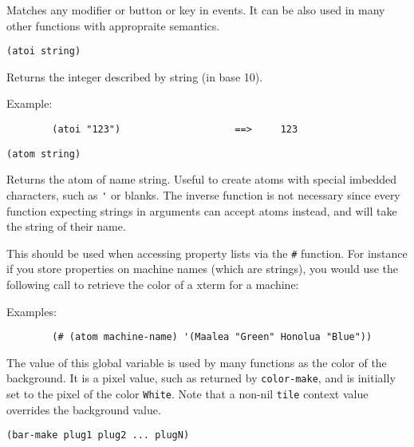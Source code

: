 
Matches any modifier or button or key in events. It can be also used in many
other functions with appropraite semantics.

        
{\usagefont\begin{verbatim}
(atoi string)
\end{verbatim}}\usageupspace

Returns the integer described by string (in base 10).

{Example:\exemplefont\upspace\begin{verbatim}
        (atoi "123")                    ==>     123
\end{verbatim}}

        
{\usagefont\begin{verbatim}
(atom string)
\end{verbatim}}\usageupspace

Returns the atom of name string. Useful to create atoms with special
imbedded characters, such as \verb"'" or blanks. The inverse function is not
necessary since every {\WOOL} function expecting strings in arguments can
accept atoms instead, and will take the string of their name.  

This should be used when accessing property lists via the \verb|#| function.
For instance if you store properties on machine names (which are strings),
you would use the following call to retrieve the color of a xterm for a
machine:

{Examples:\exemplefont\upspace\begin{verbatim}
        (# (atom machine-name) '(Maalea "Green" Honolua "Blue"))
\end{verbatim}}

        

The value of this global variable is used by many functions as the color of
the background. It is a pixel value, such as returned by \verb"color-make",
and is initially set to the pixel of the color \verb"White".  Note that
a non-nil \verb"tile" context value overrides the background value.

        
{\usagefont\begin{verbatim}
(bar-make plug1 plug2 ... plugN)
\end{verbatim}}\usageupspace

